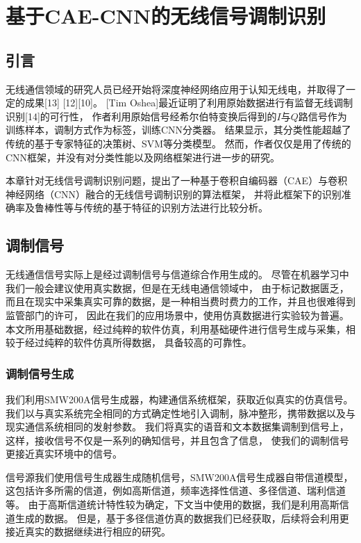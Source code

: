 \chapter{基于CAE-CNN的无线信号调制识别}

\section{引言}

无线通信领域的研究人员已经开始将深度神经网络应用于认知无线电，并取得了一定的成果[13] [12][10]。
[Tim Oshea]最近证明了利用原始数据进行有监督无线调制识别[14]的可行性，
作者利用原始信号经希尔伯特变换后得到的$I$与$Q$路信号作为训练样本，调制方式作为标签，训练CNN分类器。
结果显示，其分类性能超越了传统的基于专家特征的决策树、SVM等分类模型。
然而，作者仅仅是用了传统的CNN框架，并没有对分类性能以及网络框架进行进一步的研究。\par

本章针对无线信号调制识别问题，提出了一种基于卷积自编码器（CAE）与卷积神经网络（CNN）融合的无线信号调制识别的算法框架，
并将此框架下的识别准确率及鲁棒性等与传统的基于特征的识别方法进行比较分析。\par

\section{调制信号}

无线通信信号实际上是经过调制信号与信道综合作用生成的。
尽管在机器学习中我们一般会建议使用真实数据，但是在无线电通信领域中，
由于标记数据匮乏，而且在现实中采集真实可靠的数据，是一种相当费时费力的工作，并且也很难得到监管部门的许可，
因此在我们的应用场景中，使用仿真数据进行实验较为普遍。
本文所用基础数据，经过纯粹的软件仿真，利用基础硬件进行信号生成与采集，相较于经过纯粹的软件仿真所得数据，
具备较高的可靠性。\par
\subsection{调制信号生成}
我们利用SMW200A信号生成器，构建通信系统框架，获取近似真实的仿真信号。
我们以与真实系统完全相同的方式确定性地引入调制，脉冲整形，携带数据以及与现实通信系统相同的发射参数。 
我们将真实的语音和文本数据集调制到信号上，这样，接收信号不仅是一系列的确知信号，并且包含了信息，
使我们的调制信号更接近真实环境中的信号。\par

信号源我们使用信号生成器生成随机信号，SMW200A信号生成器自带信道模型，这包括许多所需的信道，例如高斯信道，频率选择性信道、多径信道、瑞利信道等。
由于高斯信道统计特性较为确定，下文当中使用的数据，我们是利用高斯信道生成的数据。
但是，基于多径信道仿真的数据我们已经获取，后续将会利用更接近真实的数据继续进行相应的研究。\par

